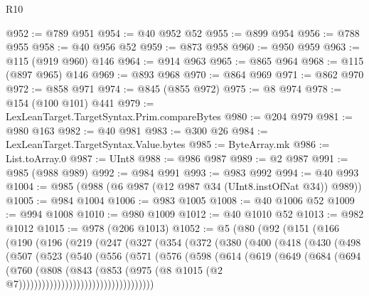 \begin{lexlean}{R10}
\begin{coremodule}
@952 := @789 @951
@954 := @40 @952 @52
@955 := @899 @954
@956 := @788 @955
@958 := @40 @956 @52
@959 := @873 @958
@960 := @950 @959
@963 := @115 (@919 @960) @146
@964 := @914 @963
@965 := @865 @964
@968 := @115 (@897 @965) @146
@969 := @893 @968
@970 := @864 @969
@971 := @862 @970
@972 := @858 @971
@974 := @845 (@855 @972)
@975 := @8 @974
@978 := @154 (@100 @101) @441
@979 := LexLeanTarget.TargetSyntax.Prim.compareBytes
@980 := @204 @979
@981 := @980 @163
@982 := @40 @981
@983 := @300 @26
@984 := LexLeanTarget.TargetSyntax.Value.bytes
@985 := ByteArray.mk
@986 := List.toArray.{0}
@987 := UInt8
@988 := @986 @987
@989 := @2 @987
@991 := @985 (@988 @989)
@992 := @984 @991
@993 := @983 @992
@994 := @40 @993
@1004 := @985 (@988 (@6 @987 (@12 @987 @34 (UInt8.instOfNat @34)) @989))
@1005 := @984 @1004
@1006 := @983 @1005
@1008 := @40 @1006 @52
@1009 := @994 @1008
@1010 := @980 @1009
@1012 := @40 @1010 @52
@1013 := @982 @1012
@1015 := @978 (@206 @1013)
@1052 := @5
    (@80
      (@92
        (@151
          (@166
            (@190
              (@196
                (@219
                  (@247
                    (@327
                      (@354
                        (@372
                          (@380
                            (@400
                              (@418
                                (@430
                                  (@498
                                    (@507
                                      (@523
                                        (@540
                                          (@556
                                            (@571
                                              (@576
                                                (@598
                                                  (@614
                                                    (@619
                                                      (@649
                                                        (@684
                                                          (@694
                                                            (@760
                                                              (@808
                                                                (@843
                                                                  (@853
                                                                    (@975
                                                                      (@8
                                                                        @1015
                                                                        (@2
                                                                          @7)))))))))))))))))))))))))))))))))))

\end{coremodule}
\end{lexlean}
